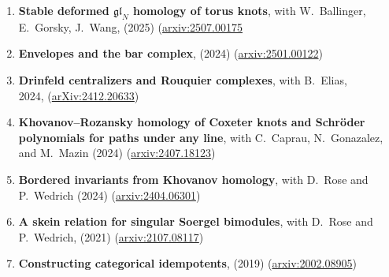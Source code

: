 \documentclass[12pt]{amsart}
\begin{document}
\begin{enumerate}\setlength{\itemsep}{7pt}
\item {\bf Stable deformed $\mathfrak{gl}_N$ homology of torus knots}, with W.~Ballinger, E.~Gorsky, J.~Wang, (2025) (\href{https://arxiv.org/abs/2507.00175}{arxiv:2507.00175}

\item {\bf Envelopes and the bar complex}, (2024) (\href{https://arxiv.org/abs/2501.00122}{arxiv:2501.00122})

\item {\bf  Drinfeld centralizers and Rouquier complexes}, with B.~Elias, \\  2024, (\href{https://arxiv.org/abs/2412.20633}{arXiv:2412.20633})

\item{\bf Khovanov--Rozansky homology of Coxeter knots and Schr\"oder polynomials for paths under any line}, with C.~Caprau, N.~Gonazalez, and M.~Mazin (2024) (\href{https://arxiv.org/abs/2407.18123}{arxiv:2407.18123})

\item {\bf Bordered invariants from Khovanov homology}, with D.~Rose and P.~Wedrich (2024) (\href{https://arxiv.org/abs/2404.06301}{arxiv:2404.06301})


%


\item{\bf A skein relation for singular Soergel bimodules}, with D.~Rose and P.~Wedrich,  (2021) (\href{https://arxiv.org/abs/2107.08117}{arxiv:2107.08117})




\item {\bf Constructing categorical idempotents}, (2019) (\href{https://arxiv.org/abs/2002.08905}{arxiv:2002.08905})



\end{enumerate}
\end{document}
